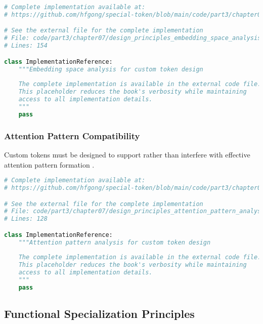 \begin{lstlisting}[language=Python, caption={Embedding space analysis for custom token design}]
# Complete implementation available at:
# https://github.com/hfgong/special-token/blob/main/code/part3/chapter07/design_principles_embedding_space_analysis_for_c.py

# See the external file for the complete implementation
# File: code/part3/chapter07/design_principles_embedding_space_analysis_for_c.py
# Lines: 154

class ImplementationReference:
    """Embedding space analysis for custom token design
    
    The complete implementation is available in the external code file.
    This placeholder reduces the book's verbosity while maintaining
    access to all implementation details.
    """
    pass
\end{lstlisting}

\subsubsection{Attention Pattern Compatibility}

Custom tokens must be designed to support rather than interfere with effective attention pattern formation \citep{voita2019analyzing, tenney2019what}.

\begin{lstlisting}[language=Python, caption={Attention pattern analysis for custom token design}]
# Complete implementation available at:
# https://github.com/hfgong/special-token/blob/main/code/part3/chapter07/design_principles_attention_pattern_analysis_for.py

# See the external file for the complete implementation
# File: code/part3/chapter07/design_principles_attention_pattern_analysis_for.py
# Lines: 128

class ImplementationReference:
    """Attention pattern analysis for custom token design
    
    The complete implementation is available in the external code file.
    This placeholder reduces the book's verbosity while maintaining
    access to all implementation details.
    """
    pass
\end{lstlisting}

\subsection{Functional Specialization Principles}

